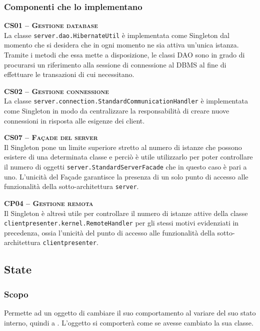 \subsubsection{Componenti che lo implementano}
\begin{description}
  \item{\scshape\bfseries CS01 -- Gestione database}\\
La classe \texttt{server.dao.HibernateUtil} è implementata come Singleton dal momento che si desidera che in ogni momento ne sia attiva un'unica istanza. Tramite i metodi che essa mette a disposizione, le classi DAO sono in grado di procurarsi un riferimento alla sessione di connessione al DBMS al fine di effettuare le transazioni di cui necessitano.
  
  \item{\scshape\bfseries CS02 -- Gestione connessione}\\
La classe \texttt{server.connection.StandardCommunicationHandler} è implementata come Singleton in modo da centralizzare la responsabilità di creare nuove connessioni in risposta alle esigenze dei client.

  \item{\scshape\bfseries CS07 -- Façade del server}\\
Il  Singleton pone un limite superiore stretto al numero di istanze che possono esistere di una determinata classe e perciò è utile utilizzarlo per poter controllare il numero di oggetti \texttt{server.StandardServerFacade} che in questo caso è pari a uno. L'unicità del Façade garantisce la presenza di un solo punto di accesso alle funzionalità della sotto-architettura \texttt{server}.

  \item{\scshape\bfseries CP04 -- Gestione remota}\\
Il  Singleton è altresì utile per controllare il numero di istanze attive della classe \texttt{clientpresenter.kernel.RemoteHandler} per gli stessi motivi evidenziati in precedenza, ossia l'unicità del punto di accesso alle funzionalità della sotto-architettura \texttt{clientpresenter}.

\end{description}

\subsection{State}

\subsubsection{Scopo}
Permette ad un oggetto di cambiare il suo comportamento al variare del suo stato interno, quindi a . L'oggetto si comporterà come se avesse cambiato la sua classe.

